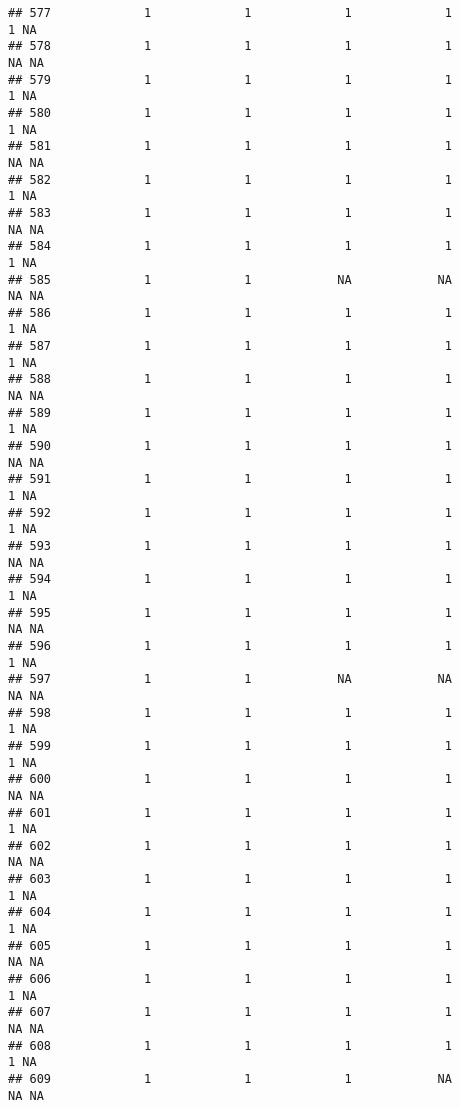 \documentclass[
]{article}
\begin{document}
\begin{verbatim}
## 577             1             1             1             1             1 NA
## 578             1             1             1             1            NA NA
## 579             1             1             1             1             1 NA
## 580             1             1             1             1             1 NA
## 581             1             1             1             1            NA NA
## 582             1             1             1             1             1 NA
## 583             1             1             1             1            NA NA
## 584             1             1             1             1             1 NA
## 585             1             1            NA            NA            NA NA
## 586             1             1             1             1             1 NA
## 587             1             1             1             1             1 NA
## 588             1             1             1             1            NA NA
## 589             1             1             1             1             1 NA
## 590             1             1             1             1            NA NA
## 591             1             1             1             1             1 NA
## 592             1             1             1             1             1 NA
## 593             1             1             1             1            NA NA
## 594             1             1             1             1             1 NA
## 595             1             1             1             1            NA NA
## 596             1             1             1             1             1 NA
## 597             1             1            NA            NA            NA NA
## 598             1             1             1             1             1 NA
## 599             1             1             1             1             1 NA
## 600             1             1             1             1            NA NA
## 601             1             1             1             1             1 NA
## 602             1             1             1             1            NA NA
## 603             1             1             1             1             1 NA
## 604             1             1             1             1             1 NA
## 605             1             1             1             1            NA NA
## 606             1             1             1             1             1 NA
## 607             1             1             1             1            NA NA
## 608             1             1             1             1             1 NA
## 609             1             1             1            NA            NA NA

\end{verbatim}
\end{document}

